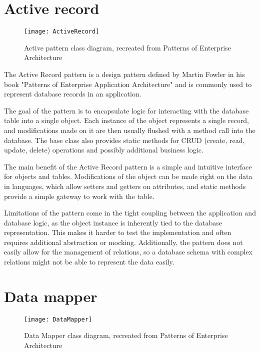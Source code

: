 \section*{Active record}

\begin{figure}[b]
    \caption{Active pattern class diagram, recreated from Patterns of Enterprise Architecture}
    \centering
    \texttt{[image: ActiveRecord]}
\end{figure}

The Active Record pattern is a design pattern defined by Martin Fowler in his
book "Patterns of Enterprise Application Architecture"
\cite[p. 160]{fowler-patterns-2003} and is commonly used to represent database
records in an application.

The goal of the pattern is to encapsulate logic for interacting with the
database table into a single object. Each instance of the object represents a
single record, and modifications made on it are then usually flushed with a
method call into the database. The base class also provides static methods for
CRUD (create, read, update, delete) operations and possibly additional business
logic.  

The main benefit of the Active Record pattern is a simple and intuitive
interface for objects and tables. Modifications of the object can be made right
on the data in languages, which allow setters and getters on attributes, and
static methods provide a simple gateway to work with the table. 

Limitations of the pattern come in the tight coupling between the application
and database logic, as the object instance is inherently tied to the database
representation. This makes it harder to test the implementation and often
requires additional abstraction or mocking. Additionally, the pattern does not
easily allow for the management of relations, so a database schema with complex
relations might not be able to represent the data easily. 


\section*{Data mapper}

\begin{figure}[b]
    \caption{Data Mapper class diagram, recreated from Patterns of Enterprise Architecture}
    \centering
    \texttt{[image: DataMapper]}
\end{figure}

